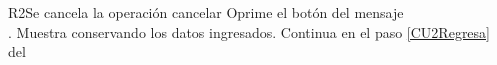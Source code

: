 \begin{UCtrayectoriaA}{R2}{Se cancela la operación cancelar}
    \UCpaso[\UCactor] Oprime el botón  del mensaje
        \\\textbf{}.
    \UCpaso Muestra  conservando los datos ingresados.
    \UCpaso Continua en el paso \ref{CU2Regresa} del 
\end{UCtrayectoriaA}
		
